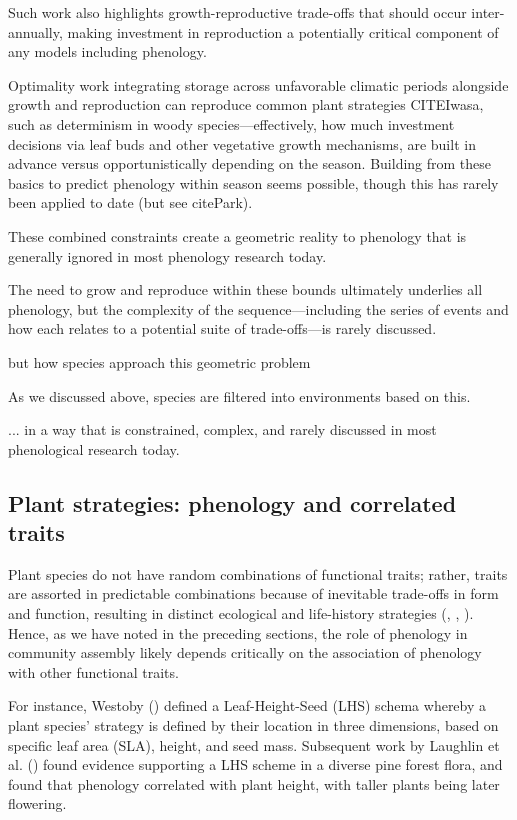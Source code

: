 \documentclass[11pt]{article}
\begin{document}
Such work also highlights growth-reproductive trade-offs that should occur inter-annually, making investment in reproduction a potentially critical component of any models including phenology. 

Optimality work integrating storage across unfavorable climatic periods alongside growth and reproduction can reproduce common plant strategies CITEIwasa, such as determinism in woody species---effectively, how much investment decisions via leaf buds and other vegetative growth mechanisms, are built in advance versus opportunistically depending on the season. Building from these basics to predict phenology within season seems possible, though this has rarely been applied to date (but see citePark). 

These combined constraints create a geometric reality to phenology that is generally ignored in most phenology research today. 

The need to grow and reproduce within these bounds ultimately underlies all phenology, but the complexity of the sequence---including the series of events and how each relates to a potential suite of trade-offs---is rarely discussed. 

but how species approach this geometric problem 

As we discussed above, species are filtered into environments based on this.

... in a way that is constrained, complex, and rarely discussed in most phenological research today.  

  

\subsection*{Plant strategies: phenology and correlated traits}

Plant species do not have random combinations of functional traits; rather, traits are assorted in predictable combinations because of inevitable trade-offs in form and function, resulting in distinct ecological and life-history strategies (\citet{stearns1998evolution},  \citet{adler2014functional}, \citet{westoby2002plant}). Hence, as we have noted in the preceding sections, the role of phenology in community assembly likely depends critically on the association of phenology with other functional traits.

For instance, Westoby (\citet{westoby1998leaf}) defined a Leaf-Height-Seed (LHS) schema whereby a plant species’ strategy is defined by their location in three dimensions, based on specific leaf area (SLA), height, and seed mass. Subsequent work by Laughlin et al. (\citet{laughlin2010multi}) found evidence supporting a LHS scheme in a diverse pine forest flora, and found that phenology correlated with plant height, with taller plants being later flowering. 
\end{document}
